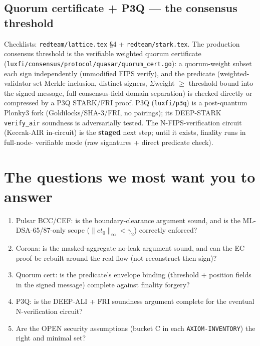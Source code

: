 \documentclass[11pt]{article}
\begin{document}
\subsection{Quorum certificate + P3Q --- the consensus threshold}
Checklists: \texttt{redteam/lattice.tex} \S4 + \texttt{redteam/stark.tex}. The
production consensus threshold is the verifiable weighted quorum certificate
(\texttt{luxfi/consensus/protocol/quasar/quorum\_cert.go}): a quorum-weight
subset each sign independently (unmodified FIPS verify), and the predicate
(weighted-validator-set Merkle inclusion, distinct signers, $\Sigma$weight
$\ge$ threshold bound into the signed message, full consensus-field domain
separation) is checked directly or compressed by a P3Q STARK/FRI proof. P3Q
(\texttt{luxfi/p3q}) is a post-quantum Plonky3 fork (Goldilocks/SHA-3/FRI, no
pairings); its DEEP-STARK \texttt{verify\_air} soundness is adversarially
tested. The N-FIPS-verification circuit (Keccak-AIR in-circuit) is the
\textbf{staged} next step; until it exists, finality runs in full-node-
verifiable mode (raw signatures + direct predicate check).

\section{The questions we most want you to answer}
\begin{enumerate}[leftmargin=*]
  \item Pulsar BCC/CEF: is the boundary-clearance argument sound, and is the
    ML-DSA-65/87-only scope ($\|c t_0\|_\infty < \gamma_2$) correctly enforced?
  \item Corona: is the masked-aggregate no-leak argument sound, and can the EC
    proof be rebuilt around the real flow (not reconstruct-then-sign)?
  \item Quorum cert: is the predicate's envelope binding (threshold + position
    fields in the signed message) complete against finality forgery?
  \item P3Q: is the DEEP-ALI + FRI soundness argument complete for the
    eventual N-verification circuit?
  \item Are the OPEN security assumptions (bucket C in each
    \texttt{AXIOM-INVENTORY}) the right and minimal set?
\end{enumerate}
\end{document}
